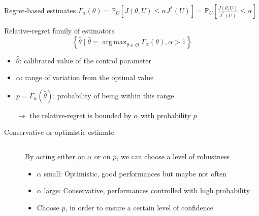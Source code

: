 \documentclass[10pt,aspectratio=169,usepdftitle=false]{beamer}
\newcommand{\Kspace}{\Theta}
\newcommand{\Prob}{\mathbb{P}}
\DeclareMathOperator*{\argmax}{arg\,max}
\newcommand{\kk}{\theta}
\newcommand{\UU}{U}
\newcommand{\inputpgf}[2][\textwidth]{
  \renewcommand\rmfamily{\sffamily}
  \resizebox{#1}{!}{}}
\begin{document}
\begin{frame}{Regret-based estimates}
  $\Gamma_{\alpha}(\kk)=\Prob_{\UU}[J(\kk, \UU) \leq \alpha J^*(\UU)]=\Prob_{\UU}[\frac{J(\kk, \UU)}{J^*(\UU)} \leq \alpha]$
  \begin{block}{Relative-regret family of estimators \citep{trappler_robust_2020}}
    \begin{equation}
      \left\{ \hat{\kk} \mid \hat{\kk} = \argmax_{\kk \in \Kspace} \Gamma_{\alpha}(\kk), \alpha>1 \right\}
    \end{equation}
  \begin{itemize}
  \item $\hat{\kk}$: calibrated value of the control parameter
  \item $\alpha$: range of variation from the optimal value
  \item $p = \Gamma_{\alpha}(\hat{\kk})$: probability of being within this range
  \item[$\rightarrow$] \alert{the relative-regret is bounded by $\alpha$ with probability $p$}
  \end{itemize}
  \end{block}
\end{frame}

\begin{frame}{Conservative or optimistic estimate}
  \begin{columns}
    \begin{column}{0.5\textwidth}
  \begin{center}
  \inputpgf[0.9\textheight]{/home/victor/acadwriting/Slides/Figures/relaxation_2sides.pgf}
\end{center}
\end{column}
\begin{column}{0.5\textwidth}
  By acting either on $\alpha$ or on $p$, we can choose a level of robustness
  \begin{itemize}
  \item $\alpha$ small: Optimistic, good performances but maybe not often
  \item $\alpha$ large: Conservative, performances controlled with high probability
  \item Choose $p$, in order to ensure a certain level of confidence
  \end{itemize}
\end{column}
\end{columns}
\end{frame}
\end{document}
